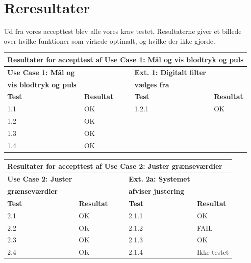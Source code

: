 \section{Reresultater}

Ud fra vores accepttest blev alle vores krav testet. Resultaterne giver et billede over hvilke funktioner som virkede optimalt, og hvilke der ikke gjorde. 

\begin{table}[h!]
	\centering
	\begin{tabular}{llllll}
		\multicolumn{6}{l}{\cellcolor[HTML]{187ABD}\textbf{Resultater for accepttest af Use Case 1: Mål og vis blodtryk og puls}} \\ \hline
		\textbf{Use Case 1: Mål og} & \multicolumn{1}{l|}{} &  & \multicolumn{1}{l|}{} & \textbf{Ext. 1: Digitalt filter} &  \\
		\textbf{vis blodtryk og puls} & \multicolumn{1}{l|}{} &  & \multicolumn{1}{l|}{} & \textbf{vælges fra} &  \\ \cline{1-2} \cline{5-6} 
		\textbf{Test} & \multicolumn{1}{l|}{\textbf{Resultat}} &  & \multicolumn{1}{l|}{} & \textbf{Test} & \textbf{Resultat} \\ \cline{1-2} \cline{5-6} 
		1.1 & \multicolumn{1}{l|}{OK} &  & \multicolumn{1}{l|}{} & 1.2.1 & OK \\ \cline{1-2} \cline{5-6} 
		1.2 & \multicolumn{1}{l|}{OK} &  & \multicolumn{1}{l|}{} &  &  \\ \cline{1-2} \cline{5-6} 
		1.3 & \multicolumn{1}{l|}{OK} &  & \multicolumn{1}{l|}{} &  &  \\ \cline{1-2} \cline{5-6} 
		1.4 & \multicolumn{1}{l|}{OK} &  & \multicolumn{1}{l|}{} &  & 
	\end{tabular}
\end{table}

\begin{table}[h!]
	\centering
	\begin{tabular}{llllll}
		\multicolumn{6}{l}{\cellcolor[HTML]{187ABD}\textbf{Resultater for accepttest af Use Case 2: Juster grænseværdier}} \\ \hline
		\textbf{Use Case 2: Juster} & \multicolumn{1}{l|}{} &  & \multicolumn{1}{l|}{} & \textbf{Ext. 2a: Systemet} &  \\
		\textbf{grænseværdier} & \multicolumn{1}{l|}{} &  & \multicolumn{1}{l|}{} & \textbf{afviser justering} &  \\ \cline{1-2} \cline{5-6} 
		\textbf{Test} & \multicolumn{1}{l|}{\textbf{Resultat}} &  & \multicolumn{1}{l|}{} & \textbf{Test} & \textbf{Resultat} \\ \cline{1-2} \cline{5-6} 
		2.1 & \multicolumn{1}{l|}{OK} &  & \multicolumn{1}{l|}{} & 2.1.1 & OK \\ \cline{1-2} \cline{5-6} 
		2.2 & \multicolumn{1}{l|}{OK} &  & \multicolumn{1}{l|}{} & 2.1.2 & FAIL \\ \cline{1-2} \cline{5-6} 
		2.3 & \multicolumn{1}{l|}{OK} &  & \multicolumn{1}{l|}{} & 2.1.3 & OK \\ \cline{1-2} \cline{5-6} 
		2.4 & \multicolumn{1}{l|}{OK} &  & \multicolumn{1}{l|}{} & 2.1.4 & Ikke testet
	\end{tabular}
\end{table}

